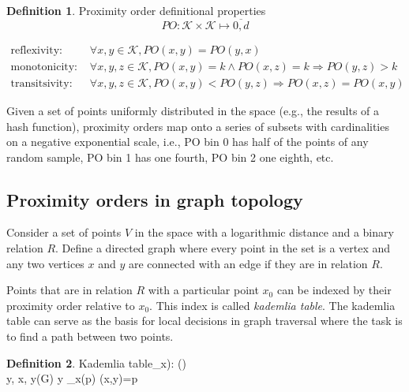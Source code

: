 \documentclass[a4paper,10pt,fullpage]{article}
\numberwithin{equation}{section}
\newcommand\gloss[1]{\emph{\gls{#1}}}
\newcommand\PO{\mathit{PO}}
\newcommand\Keys{\mathcal{K}}
\theoremstyle{definition}
\newtheorem{definition}{Definition}[section]
\begin{document}
\begin{definition}{Proximity order definitional properties}\label{def:PO}
\begin{equation}
\PO: \Keys\times \Keys\mapsto \overline{0,d}
\end{equation}

\begin{subequations}
  \begin{align}
    \label{eq:PO-constraint-symmetry} \text{reflexivity:  }&\forall x,y\in \mathcal{K}, \PO(x,y)=\PO(y,x)\\
    \label{eq:PO-constraint-monotonicity}\text{monotonicity:   }&\forall x,y,z\in \mathcal{K}, \PO(x,y)=k \land  \PO(x,z)=k \Rightarrow  \PO(y,z)>k\\
\label{eq:PO-constraint-transitivity}\text{transitsivity:   }&\forall x,y,z\in \mathcal{K}, \PO(x,y)<\PO(y,z) \Rightarrow \PO(x,z)=\PO(x,y)
   \end{align}
\end{subequations}
\end{definition}

Given a set of points uniformly distributed in the space (e.g., the results of a hash function), proximity orders map onto a series of subsets with cardinalities on a negative exponential scale, i.e., PO bin 0 has half of the points of any random sample, PO bin 1 has one fourth, PO bin 2 one eighth, etc.

\subsection{Proximity orders in graph topology}

Consider a set of points $V$ in the space with a logarithmic distance and 
a binary relation $R$. Define a directed graph where every point in the set is a vertex and any two vertices $x$ and $y$ are  connected with an edge if they are in relation $R$. 


Points that are in relation $R$ with a particular point $x_0$ can be indexed by their proximity order relative to $x_0$. This index is called \gloss{kademlia table}.
The kademlia table can serve as the basis for local decisions in graph traversal where the task is to find a path between two points. 


\begin{definition}{Kademlia table}\label{def:kademlia-table}
_x): \mapsto {}()\\
\forall y, \langle x, y\rangle \in {}(G) \rightarrow y \in {}_x(p) \Longleftrigharrow \PO(x,y)=p 
\end{definition}
\end{document}
